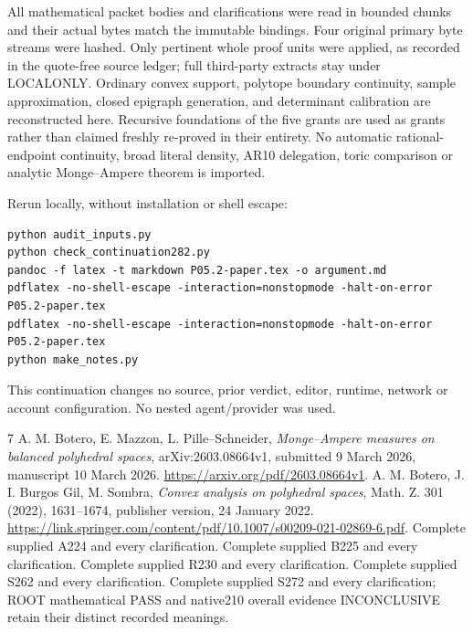 \documentclass[11pt]{article}
\begin{document}
All mathematical packet bodies and clarifications were read in bounded
chunks and their actual bytes match the immutable bindings. Four
original primary byte streams were hashed. Only pertinent whole proof
units were applied, as recorded in the quote-free source ledger; full
third-party extracts stay under LOCALONLY. Ordinary convex support,
polytope boundary continuity, sample approximation, closed epigraph
generation, and determinant calibration are reconstructed here.
Recursive foundations of the five grants are used as grants rather
than claimed freshly re-proved in their entirety. No automatic
rational-endpoint continuity, broad literal density, AR10 delegation,
toric comparison or analytic Monge--Ampere theorem is imported.

Rerun locally, without installation or shell escape:
\begin{verbatim}
python audit_inputs.py
python check_continuation282.py
pandoc -f latex -t markdown P05.2-paper.tex -o argument.md
pdflatex -no-shell-escape -interaction=nonstopmode -halt-on-error P05.2-paper.tex
pdflatex -no-shell-escape -interaction=nonstopmode -halt-on-error P05.2-paper.tex
python make_notes.py
\end{verbatim}
This continuation changes no source, prior verdict, editor, runtime,
network or account configuration. No nested agent/provider was used.

\begin{thebibliography}{7}
 A. M. Botero, E. Mazzon, L. Pille--Schneider,
\emph{Monge--Ampere measures on balanced polyhedral spaces},
arXiv:2603.08664v1, submitted 9 March 2026, manuscript 10 March 2026.
\url{https://arxiv.org/pdf/2603.08664v1}.
 A. M. Botero, J. I. Burgos Gil, M. Sombra,
\emph{Convex analysis on polyhedral spaces}, Math. Z. 301 (2022),
1631--1674, publisher version, 24 January 2022.
\url{https://link.springer.com/content/pdf/10.1007/s00209-021-02869-6.pdf}.
 Complete supplied A224 and every clarification.
 Complete supplied B225 and every clarification.
 Complete supplied R230 and every clarification.
 Complete supplied S262 and every clarification.
 Complete supplied S272 and every clarification;
ROOT mathematical PASS and native210 overall evidence INCONCLUSIVE
retain their distinct recorded meanings.
\end{thebibliography}
\end{document}
